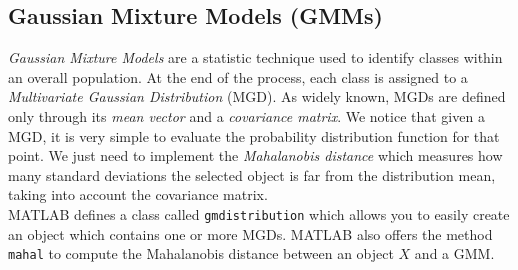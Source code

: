 \subsection{Gaussian Mixture Models (GMMs)}
\label{subsec:gmm}

\textit{Gaussian Mixture Models} are a statistic technique used to identify classes within an overall population. At the end of the process, each class is assigned to a \textit{Multivariate Gaussian Distribution} (MGD).  As widely known, MGDs are defined only through its \textit{mean vector} and a \textit{covariance matrix}. We notice that given a MGD, it is very simple to evaluate the probability distribution function for that point. We just need to implement the \textit{Mahalanobis distance} which measures how many standard deviations the selected object is far from the distribution mean, taking into account the covariance matrix. \\
%
MATLAB defines a class called \texttt{gmdistribution} which allows you to easily create an object which contains one or more MGDs. MATLAB also offers the method \texttt{mahal} to compute the Mahalanobis distance between an object $X$ and a GMM.